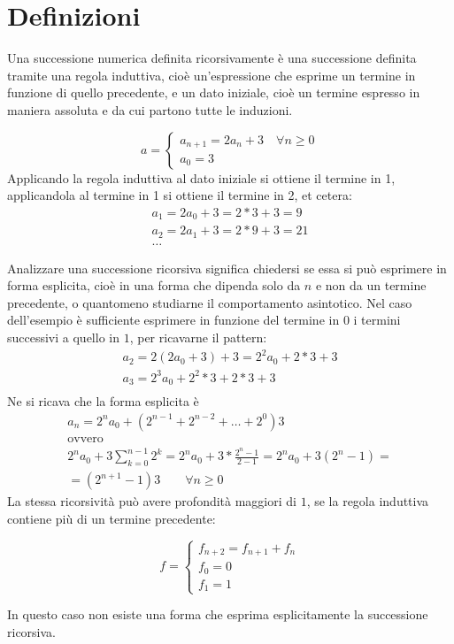 \section{Definizioni}
Una successione numerica definita ricorsivamente è una successione definita tramite una regola induttiva, cioè un'espressione che esprime un termine in funzione di quello precedente, e un dato iniziale, cioè un termine espresso in maniera assoluta e da cui partono tutte le induzioni.
\begin{examp}
	\[
		a=
		\begin{cases}
			a_{n+1}=2a_n+3 \quad \forall n \geq 0 \\
			a_0=3
		\end{cases}
	\]
	Applicando la regola induttiva al dato iniziale si ottiene il termine in 1, applicandola al termine in 1 si ottiene il termine in 2, et cetera:
	\begin{gather*}
		a_1=2a_0+3=2*3+3=9\\
		a_2=2a_1+3=2*9+3=21\\
		\dots
	\end{gather*}
\end{examp}
Analizzare una successione ricorsiva significa chiedersi se essa si può esprimere in forma esplicita, cioè in una forma che dipenda solo da $n$ e non da un termine precedente, o quantomeno studiarne il comportamento asintotico. Nel caso dell'esempio è sufficiente esprimere in funzione del termine in $0$ i termini successivi a quello in $1$, per ricavarne il pattern:
\begin{gather*}
	a_2=2(2a_0+3)+3=2^2a_0+2*3+3\\
	a_3=2^3a_0+2^2*3+2*3+3\\
\end{gather*}
Ne si ricava che la forma esplicita è
\begin{gather*}
	a_n=2^na_0+(2^{n-1}+2^{n-2}+\dots+2^0)3\\
	\text{ovvero}\\
	2^na_0+3\sum_{k=0}^{n-1} 2^k=2^na_0+3*\frac{2^n-1}{2-1}=2^na_0+3(2^n-1)=\\
	=(2^{n+1}-1)3 \qquad \forall n \geq 0
\end{gather*}
La stessa ricorsività può avere profondità maggiori di $1$, se la regola induttiva contiene più di un termine precedente:
\begin{examp}
	\[
		f=
		\begin{cases}
			f_{n+2}=f_{n+1}+f_n \\
			f_0=0               \\
			f_1=1
		\end{cases}
	\]
\end{examp}
In questo caso non esiste una forma che esprima esplicitamente la successione ricorsiva.

